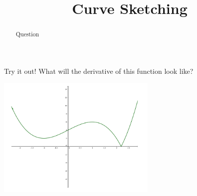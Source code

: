 \documentclass[handout]{ximera}
\title{Curve Sketching}
\begin{document}
\begin{abstract} Question %
\end{abstract}

\maketitle

Try it out! What will the derivative of this function look like?

\includegraphics[width=3in]{graph1.png}
\end{document}

